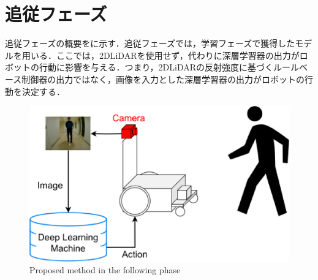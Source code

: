 
\section{追従フェーズ}

  追従フェーズの概要をに示す．追従フェーズでは，学習フェーズで獲得したモデルを用いる．ここでは，2DLiDARを使用せず，代わりに深層学習器の出力がロボットの行動に影響を与える．つまり，2DLiDARの反射強度に基づくルールベース制御器の出力ではなく，画像を入力とした深層学習器の出力がロボットの行動を決定する．

  \vspace{0.5cm}

  \begin{figure}[h]
    \centering
    \includegraphics[keepaspectratio, scale=0.45] {images/eps/RobotGuidance_following_system}
    \captionsetup{justification=raggedright} %
    \caption{Proposed method in the following phase}
    \label{Fig:RobotGuidance_following_system}
  \end{figure}

  \vspace{0.5cm}

